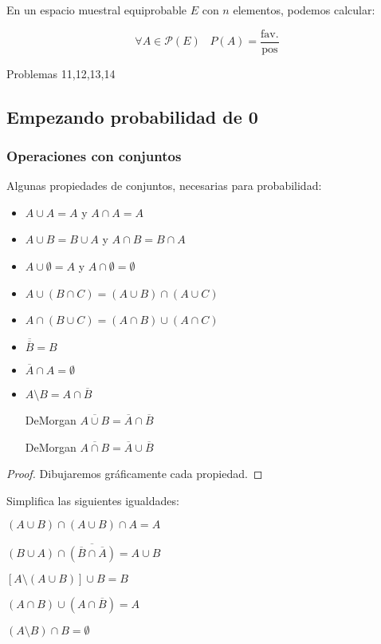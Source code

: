 \begin{prop}
En un espacio muestral equiprobable $E$ con $n$ elementos, podemos calcular:

\[\forall A\in \mathcal{P}(E)\;\;\; P(A) = \frac{\text{fav.}}{\text{pos}}\]
\end{prop}

Problemas 11,12,13,14


\subsection{Empezando probabilidad de 0}

\subsubsection{Operaciones con conjuntos}

\begin{prop}
Algunas propiedades de conjuntos, necesarias para probabilidad:

	\begin{itemize}
		\item $A\cup A=A$ y $A\cap A = A$
		\item $A\cup B=B\cup A$ y $A\cap B = B\cap A$
		\item $A\cup \emptyset=A$ y $A\cap \emptyset = \emptyset$
		\item $A\cup (B\cap C) = (A\cup B)\cap (A\cup C)$
		\item $A\cap (B\cup C) = (A\cap B)\cup (A\cap C)$
		\item $\overline{\overline{B}} = B$
		\item $\overline{A}\cap A = \emptyset$
		\item $A\setminus B = A\cap \overline{B}$
		\item[DeMorgan] $\overline{A\cup B} = \overline{A}\cap\overline{B}$
		\item[DeMorgan] $\overline{A\cap B} = \overline{A}\cup\overline{B}$
	\end{itemize}
\end{prop}
\begin{proof}
Dibujaremos gráficamente cada propiedad.
\end{proof}

\begin{problem}[1]
Simplifica las siguientes igualdades:

\ppart $(A\cup B)\cap (A\cup B)\cap A=A$

\ppart $(B\cup A)\cap \overline{\left(\overline{B}\cap \overline{A}\right)} = A\cup B$

\ppart $\left[A\setminus (A\cup B)\right]\cup B = B$

\ppart $(A\cap B) \cup (A\cap \overline{B}) = A$

\ppart $(A\setminus B) \cap B = \emptyset$


\solution
\end{problem}

